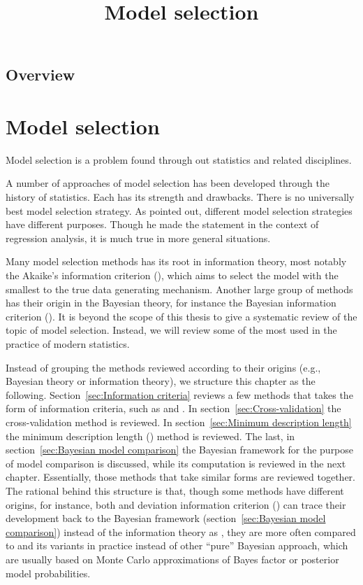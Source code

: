 \ifx\inthesis\undefined %

\title{Model selection}

\maketitle
\section{Overview}
\else %
\chapter{Model selection}
\label{cha:Model selection}
\fi %

Model selection is a problem found through out statistics and related
disciplines.

A number of approaches of model selection has been developed through the
history of statistics. Each has its strength and drawbacks. There is no
universally best model selection strategy. As \cite[][chap.~4]{Myers:1990wt}
pointed out, different model selection strategies have different purposes.
Though he made the statement in the context of regression analysis, it is much
true in more general situations.

Many model selection methods has its root in information theory, most notably
the Akaike's information criterion (\aic), which aims to select the model with
the smallest \kl \cite{Kullback:1951va} to the true data generating mechanism.
Another large group of methods has their origin in the Bayesian theory, for
instance the Bayesian information criterion (\bic). It is beyond the scope of
this thesis to give a systematic review of the topic of model selection.
Instead, we will review some of the most used in the practice of modern
statistics.  

Instead of grouping the methods reviewed according to their origins (e.g.,
Bayesian theory or information theory), we structure this chapter as the
following. Section~\ref{sec:Information criteria} reviews a few methods that
takes the form of information criteria, such as \aic and \bic. In
section~\ref{sec:Cross-validation} the cross-validation method is reviewed. In
section~\ref{sec:Minimum description length} the minimum description length
(\mdl) method is reviewed. The last, in section~\ref{sec:Bayesian model
  comparison} the Bayesian framework for the purpose of model comparison is
discussed, while its computation is reviewed in the next chapter. Essentially,
those methods that take similar forms are reviewed together. The rational
behind this structure is that, though some methods have different origins, for
instance, both \bic and deviation information criterion (\dic) can trace their
development back to the Bayesian framework (section~\ref{sec:Bayesian model
  comparison}) instead of the information theory as \aic, they are more often
compared to \aic and its variants in practice instead of other ``pure''
Bayesian approach, which are usually based on Monte Carlo approximations of
Bayes factor or posterior model probabilities.

